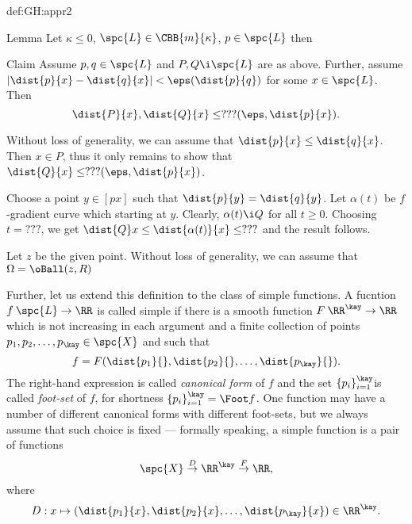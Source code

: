 {\begin{subthm}{def:GH:appr2}
\begin{thm}{Lemma}
Let $\kappa\le 0$, $\spc{L}\in\CBB{m}{\kappa}$, $p\in \spc{L}$ then 
 
\end{thm}



\begin{clm}{Claim}
Assume $p,q\in\spc{L}$ and $P,Q\i \spc{L}$ are as above.
Further, assume $|\dist{p}{x}-\dist{q}{x}|<\eps(\dist{p}{q})$ for some $x\in\spc{L}$.
Then 
$$\dist{P}{x},\dist{Q}{x}\le ???(\eps,\dist{p}{x}).$$

\end{clm}

Without loss of generality, we can assume that $\dist{p}{x}\le\dist{q}{x}$.
Then $x\in P$, thus it only remains to show that $\dist{Q}{x}\le ???(\eps,\dist{p}{x})$.

Choose a point $y\in [px]$ such that $\dist{p}{y}=\dist{q}{y}$.
Let $\alpha(t)$ be $f$-gradient curve which starting at $y$.
Clearly, $\alpha(t)\i Q$ for all $t\ge0$.
Choosing $t=???$, we get 
$\dist{Q}x\le\dist{\alpha(t)}{x}\le ???$
and the result follows.
\qeds


Let $z$ be the given point. 
Without loss of generality, we can assume that $\Omega=\oBall(z,R)$


















Further, let us extend this definition to the class of simple functions.
A fucntion $f\:\spc{L}\to\RR$ is called simple if there is  a smooth function $F\:\RR^\kay\to\RR$ which is not increasing in each argument and a finite collection of points $p_1,p_2,\dots,p_\kay\in\spc{X}$ and  such that 
$$f=F(\dist{p_1}{},\dist{p_2}{},\dots,\dist{p_\kay}{}).$$
The right-hand expression is called \emph{canonical form} of $f$ and the set $\{p_i\}_{i=1}^\kay$is called \emph{foot-set} of $f$, for shortness $\{p_i\}_{i=1}^\kay=\Foot f$.
One function may have a number of different canonical forms with different foot-sets, but we always assume that such choice is fixed --- formally speaking, a simple function is a pair of functions
$$\spc{X}\buildrel D \over \to\RR^\kay\buildrel F \over\to\RR,$$
where
$$D:x\mapsto(\dist{p_1}{x},\dist{p_2}{x},\dots,\dist{p_\kay}{x})\in\RR^\kay.$$


\end{subthm}}
